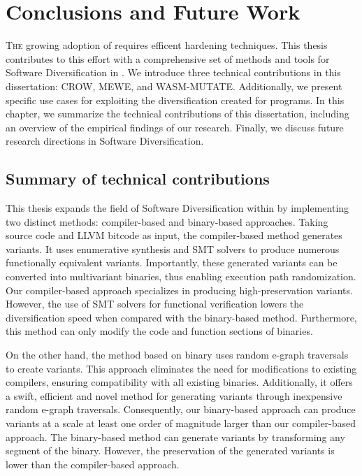 
\chapter{Conclusions and Future Work}
\label{results}


\lettrine[lines=3]{T}{he} growing adoption of \Wasm requires efficent hardening techniques.
This thesis contributes to this effort with a comprehensive set of methods and tools for Software Diversification in \Wasm.
We introduce three technical contributions in this dissertation: CROW, MEWE, and WASM-MUTATE.
Additionally, we present specific use cases for exploiting the diversification created for \Wasm programs.
In this chapter, we summarize the technical contributions of this dissertation, including an overview of the empirical findings of our research.
Finally, we discuss future research directions in \Wasm Software Diversification.

\section{Summary of technical contributions}


This thesis expands the field of Software Diversification within \Wasm by implementing two distinct methods: compiler-based and binary-based approaches. 
Taking source code and LLVM bitcode as input, the compiler-based method generates \Wasm variants.
It uses enumerative synthesis and SMT solvers to produce numerous functionally equivalent variants. 
Importantly, these generated variants can be converted into multivariant binaries, thus enabling execution path randomization. 
Our compiler-based approach specializes in producing high-preservation variants.
However, the use of SMT solvers for functional verification lowers the diversification speed when compared with the binary-based method. 
Furthermore, this method can only modify the code and function sections of \Wasm binaries.

On the other hand, the method based on binary uses random e-graph traversals to create variants. 
This approach eliminates the need for modifications to existing compilers, ensuring compatibility with all existing \Wasm binaries. 
Additionally, it offers a swift, efficient and novel method for generating variants through inexpensive random e-graph traversals. 
Consequently, our binary-based approach can produce variants at a scale at least one order of magnitude larger than our compiler-based approach. 
The binary-based method can generate variants by transforming any segment of the \wasm binary.
However, the preservation of the generated variants is lower than the compiler-based approach.

